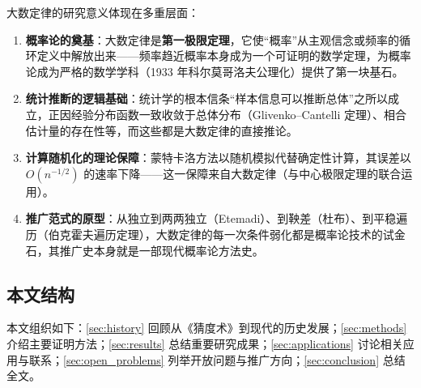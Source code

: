 大数定律的研究意义体现在多重层面：

\begin{enumerate}[label=(\arabic*)]
    \item \textbf{概率论的奠基}：大数定律是\textbf{第一极限定理}，它使“概率”从主观信念或频率的循环定义中解放出来——频率趋近概率本身成为一个可证明的数学定理，为概率论成为严格的数学学科（1933 年科尔莫哥洛夫公理化\cite{kolmogorov1933}）提供了第一块基石。
    \item \textbf{统计推断的逻辑基础}：统计学的根本信条“样本信息可以推断总体”之所以成立，正因经验分布函数一致收敛于总体分布（Glivenko--Cantelli 定理\cite{glivenko1933}）、相合估计量的存在性等，而这些都是大数定律的直接推论。
    \item \textbf{计算随机化的理论保障}：蒙特卡洛方法以随机模拟代替确定性计算，其误差以 $O(n^{-1/2})$ 的速率下降——这一保障来自大数定律（与中心极限定理的联合运用）。
    \item \textbf{推广范式的原型}：从独立到两两独立（Etemadi\cite{etemadi1981}）、到鞅差（杜布）、到平稳遍历（伯克霍夫遍历定理\cite{birkhoff1931}），大数定律的每一次条件弱化都是概率论技术的试金石，其推广史本身就是一部现代概率论方法史。
\end{enumerate}

\subsection{本文结构}

本文组织如下：\cref{sec:history} 回顾从《猜度术》到现代的历史发展；\cref{sec:methods} 介绍主要证明方法；\cref{sec:results} 总结重要研究成果；\cref{sec:applications} 讨论相关应用与联系；\cref{sec:open_problems} 列举开放问题与推广方向；\cref{sec:conclusion} 总结全文。
